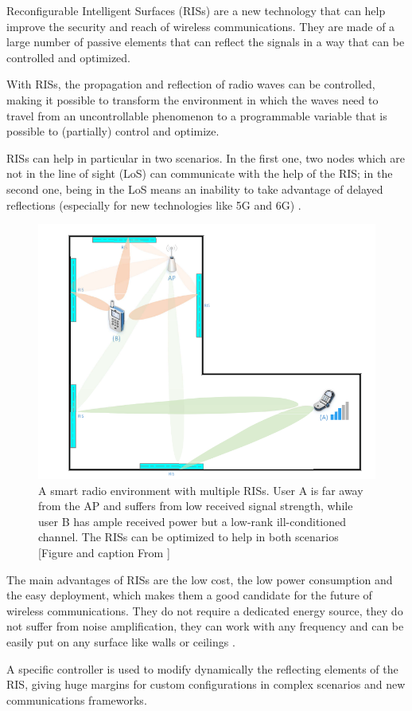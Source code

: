 Reconfigurable Intelligent Surfaces (RISs) are a new technology that can help improve the security and reach of wireless communications. They are made of a large number of passive elements that can reflect the signals in a way that can be controlled and optimized.

With RISs, the propagation and reflection of radio waves can be controlled, making it possible to transform the environment in which the waves need to travel from an uncontrollable phenomenon to a programmable variable that is possible to (partially) control and optimize.

RISs can help in particular in two scenarios. In the first one, two nodes which are not in the line of sight (LoS) can communicate with the help of the RIS; in the second one, being in the LoS means an inability to take advantage of delayed reflections (especially for new technologies like 5G and 6G) \cite{9086766}.

\begin{figure}[H]
  \centering
  \includegraphics[width=0.5\linewidth]{imgs/RIS enviroment.png}
  \caption{A smart radio environment with multiple RISs. User A is far away from the AP and suffers from low received signal strength, while user B has ample received power but a low-rank ill-conditioned channel. The RISs can be optimized to help in both scenarios [Figure and caption From \cite{9086766}]}
\end{figure}

The main advantages of RISs are the low cost, the low power consumption and the easy deployment, which makes them a good candidate for the future of wireless communications. They do not require a dedicated energy source, they do not suffer from noise amplification, they can work with any frequency and can be easily put on any surface like walls or ceilings \cite{8796365}.

A specific controller is used to modify dynamically the reflecting elements of the RIS, giving huge margins for custom configurations in complex scenarios and new communications frameworks.

